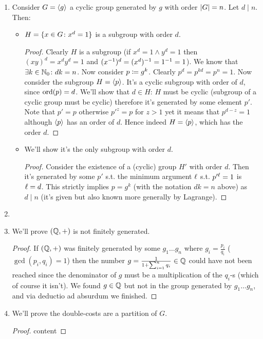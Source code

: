 \documentclass[a4paper]{article}
\begin{document}
\begin{enumerate}
\begin{proof}
			The other side will be proven via contrapositive. AFSOC $\ord(g)\nmid n \land g^{n} = 1$. Then consider the division with (minimal) remainder $n = k \ord(g) + r$ ($0 < r < \ord (g)$). Then we get that: 
			\[ 1 = g^{n} = g^{k \ord (g) + r} = g^{r} \cdot \cl{g^{\ord (g)}}^{k} = g^{r} \]
			So we found $r$ s.t. $g^{r} = 1$, and $r \neq 0$. Therefore $\ord(g) \le r$, yet $r < \ord (g)$, which yields a contradiction. 
		\end{proof}
		\item Consider $G = \langle g \rangle$ a cyclic group generated by $g$ with order $\left \lvert G \right \rvert = n$. Let $d \mid n$. Then: 
		\begin{itemize}
			\item $H = \{x \in G \colon x^{d} = 1\}$ is a subgroup with order $d$. \begin{proof}
				Clearly $H$ is a subgroup (if $x^{d} = 1 \land y^{d} = 1$ then $(xy)^{d} = x^{d}y^{d} = 1$ and $(x^{-1})^{d} = (x^{d})^{-1} = 1^{-1} = 1$). 
				We know that $\exists k \in \mathbb{N}_0 \colon dk = n$. Now consider $p \coloneqq g^{k}$. Clearly $p^{d} = p^{kd} = p^{n} = 1$. Now consider the subgroup $H = \langle p \rangle $. It's a cyclic subgroup with order of $d$, since $\operatorname{ord}(p) = d$. We'll show that $d \in H$: $H$ must be cyclic (subgroup of a cyclic group must be cyclic) therefore it's generated by some element $p'$. Note that $p' = p$ otherwise $p'^{z} = p$ for $z > 1$ yet it means that $p^{d - z} = 1$ although $\langle p \rangle$ has an order of $d$. Hence indeed $H = \langle p \rangle$, which has the order $d$. 
			\end{proof}
			\item We'll show it's the only subgroup with order $d$. \begin{proof}
				Consider the existence of a (cyclic) group $H'$ with order $d$. Then it's generated by some $p'$ s.t. the minimum argument $\ell$ s.t. $p'^{\ell} = 1 $ is $\ell = d$. This strictly implies $p = g^{k}$ (with the notation $dk = n$ above) as $d \mid n$ (it's given but also known more generally by Lagrange). 
			\end{proof}
		\end{itemize}
		\item 
		\item We'll prove $(\mathbb{Q}, +)$ is not finitely generated. \begin{proof}
			If $(\mathbb{Q}, +)$ was finitely generated by some $g_1 \dots g_n$ where $g_i = \frac{p_i}{q_i}$ ($\gcd(p_i, q_i) = 1$) then the number $g = \frac{1}{1 + \sum_{i = 1}^{n} q_i} \in \mathbb{Q}$ could have not been reached since the denominator of $g$ must be a multiplication of the $q_i$-s (which of course it isn't). We found $g \in \mathbb{Q}$ but not in the group generated by $g_1 \dots g_n$, and via deductio ad absurdum we finished. 
		\end{proof}
		\item We'll prove the double-costs are a partition of $G$. \begin{proof}
			content
		\end{proof}
	\end{enumerate}
	
\end{document}
